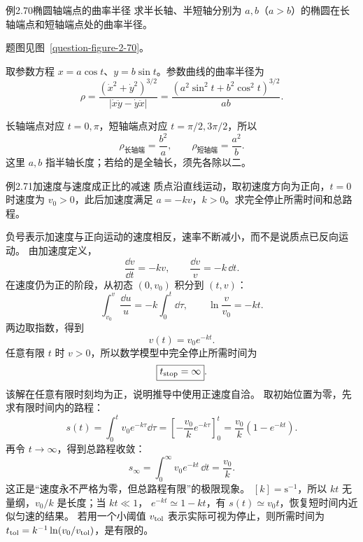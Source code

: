 \begin{origexamplebox}{例2.70\quad 椭圆轴端点的曲率半径}
求半长轴、半短轴分别为 $a,b$（$a>b$）的椭圆在长轴端点和短轴端点处的曲率半径。
\par 题图见图~\ref{question-figure-2-70}。
\KQuestionCS
\end{origexamplebox}
\begin{xesolution}
取参数方程 $x=a\cos t$、$y=b\sin t$。参数曲线的曲率半径为
\[
\rho=\frac{(\dot x^2+\dot y^2)^{3/2}}{|\dot x\ddot y-\dot y\ddot x|}
=\frac{(a^2\sin^2t+b^2\cos^2t)^{3/2}}{ab}.
\]
\EllipseCurvatureDiagram

长轴端点对应 $t=0,\pi$，短轴端点对应 $t=\pi/2,3\pi/2$，所以
\[
 \boxed{\rho_{\text{长轴端}}=\frac{b^2}{a}},\qquad
 \boxed{\rho_{\text{短轴端}}=\frac{a^2}{b}}.
\]
这里 $a,b$ 指半轴长度；若给的是全轴长，须先各除以二。
\end{xesolution}

\begin{origexamplebox}{例2.71\quad 加速度与速度成正比的减速}
质点沿直线运动，取初速度方向为正向，$t=0$ 时速度为 $v_0>0$，此后加速度满足 $a=-kv$，$k>0$。求完全停止所需时间和总路程。
\end{origexamplebox}
\begin{xesolution}
负号表示加速度与正向运动的速度相反，速率不断减小，而不是说质点已反向运动。
由加速度定义，
\[
 \frac{\dd v}{\dd t}=-kv,\qquad \frac{\dd v}{v}=-k\,\dd t.
\]
在速度仍为正的阶段，从初态 $(0,v_0)$ 积分到 $(t,v)$：
\[
 \int_{v_0}^{v}\frac{\dd u}{u}=-k\int_0^t\dd\tau,
 \qquad \ln\frac{v}{v_0}=-kt.
\]
两边取指数，得到
\[
 \boxed{v(t)=v_0e^{-kt}}.
\]
任意有限 $t$ 时 $v>0$，所以数学模型中完全停止所需时间为
\[
 \boxed{t_{\rm stop}=\infty}.
\]
该解在任意有限时刻均为正，说明推导中使用正速度自洽。
取初始位置为零，先求有限时间内的路程：
\[
 s(t)=\int_0^t v_0e^{-k\tau}\dd\tau
 =\left[-\frac{v_0}{k}e^{-k\tau}\right]_0^t
 =\frac{v_0}{k}(1-e^{-kt}).
\]
再令 $t\to\infty$，得到总路程收敛：
\[
 \boxed{s_\infty=\int_0^\infty v_0e^{-kt}\,\dd t=\frac{v_0}{k}}.
\]
这正是“速度永不严格为零，但总路程有限”的极限现象。
$[k]=\mathrm{s^{-1}}$，所以 $kt$ 无量纲，$v_0/k$ 是长度；当 $kt\ll1$，
$e^{-kt}\simeq1-kt$，有 $s(t)\simeq v_0t$，恢复短时间内近似匀速的结果。
若用一个小阈值 $v_{\rm tol}$ 表示实际可视为停止，则所需时间为
$t_{\rm tol}=k^{-1}\ln(v_0/v_{\rm tol})$，是有限的。
\end{xesolution}

